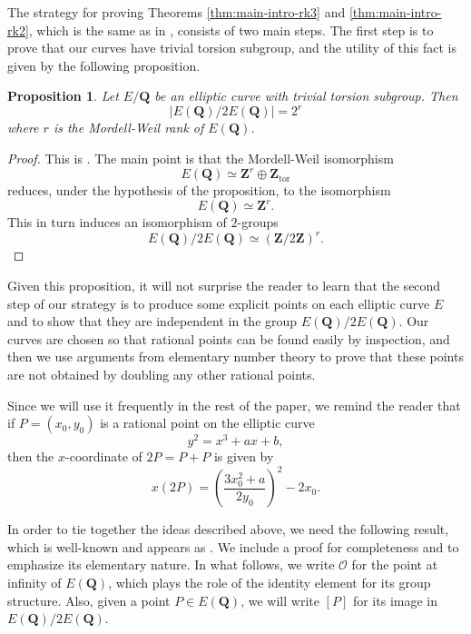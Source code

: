 \documentclass{amsart}
\newtheorem{proposition}[theorem]{Proposition}
\numberwithin{equation}{section}
\theoremstyle{remark}
\newcommand{\Z}{\mathbf{Z}}
\newcommand{\Q}{\mathbf{Q}}
\begin{document}
The strategy for proving Theorems \ref{thm:main-intro-rk3} and \ref{thm:main-intro-rk2}, which is the same as in \cite{BrownMyers}, consists of two main steps. The first step is to prove that our curves have trivial torsion subgroup, and the utility of this fact is given by the following proposition.

\begin{proposition}\label{prop:utility-of-trivial-torsion}
Let $E/\Q$ be an elliptic curve with trivial torsion subgroup. Then
\[
|E(\Q)/2E(\Q)| = 2^r
\]
where $r$ is the Mordell-Weil rank of $E(\Q)$.
\end{proposition}
\begin{proof}
This is \cite[Theorem 4]{BrownMyers}. The main point is that the Mordell-Weil isomorphism
\begin{equation*}
E(\Q) \simeq \Z^r \oplus \Z_{\mathrm{tor}}
\end{equation*}
reduces, under the hypothesis of the proposition, to the isomorphism
\begin{equation*}
E(\Q) \simeq \Z^r.
\end{equation*}
This in turn induces an isomorphism of $2$-groups
\begin{equation*}
E(\Q)/2E(\Q) \simeq (\Z/2\Z)^r.
\end{equation*}
\end{proof}

Given this proposition, it will not surprise the reader to learn that the second step of our strategy is to produce some explicit points on each elliptic curve $E$ and to show that they are independent in the group $E(\Q)/2E(\Q)$. Our curves are chosen so that rational points can be found easily by inspection, and then we use arguments from elementary number theory to prove that these points are not obtained by doubling any other rational points.

Since we will use it frequently in the rest of the paper, we remind the reader that if $P=(x_0,y_0)$ is a rational point on the elliptic curve
\[
y^2=x^3+ax+b,
\]
then the $x$-coordinate of $2P=P+P$ is given by
\begin{equation}\label{eq:doubling-formula}
x(2P) = \left(\frac{3x^2_0+a}{2y_0}\right)^2 -2x_0.
\end{equation}

In order to tie together the ideas described above, we need the following result, which is well-known and appears as \cite[Lemma 8]{BrownMyers}. We include a proof for completeness and to emphasize its elementary nature. In what follows, we write $\mathcal{O}$ for the point at infinity of $E(\Q)$, which plays the role of the identity element for its group structure. Also, given a point $P \in E(\Q)$, we will write $[P]$ for its image in $E(\Q)/2E(\Q)$.
\end{document}
